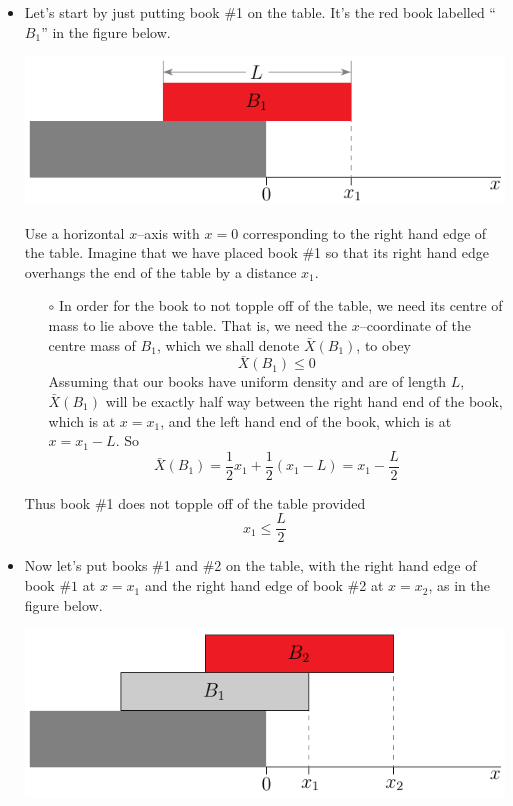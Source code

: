 \begin{itemize}
\item
Let's start by just putting book \#1 on the table. It's the red book
labelled ``$B_1$'' in the figure below.
\begin{efig}
\begin{center}
     \includegraphics{bookStackV1.pdf}
\end{center}
\end{efig}
Use a horizontal $x$--axis with $x=0$ corresponding to the right hand
edge of the table. Imagine that we have placed book \#1 so that its
right hand edge overhangs the end of the table by a distance $x_1$.
\begin{itemize}\itemsep1pt \parskip0pt  \itemindent-10pt
\item[$\circ$]
In order for the book to not topple off of the table, we need its
centre of mass to lie above the table. That is, we need the $x$--coordinate
of the centre mass of $B_1$, which we shall denote $\bar X(B_1)$, to obey
\begin{equation*}
\bar X(B_1) \le 0
\end{equation*}
Assuming that our books have uniform density and are of length
$L$, $\bar X(B_1)$ will be exactly half way between the right hand end of the
book, which is at $x=x_1$, and the left hand end of the book, which is at
$x=x_1-L$. So
\begin{equation*}
\bar X(B_1) =\frac{1}{2} x_1+\frac{1}{2}(x_1-L)
            = x_1-\frac{L}{2}
\end{equation*}
\end{itemize}
Thus book \#1 does not topple off of the table provided
\begin{equation*}
x_1\le\frac{L}{2}
\end{equation*}

\item
Now let's put books \#1 and \#2 on the table, with the right hand edge of
book \#$1$ at $x=x_1$ and the right hand edge of book \#2 at
$x=x_2$, as in the figure below.
\begin{efig}
\begin{center}
     \includegraphics{bookStackV2a.pdf}
\end{center}
\end{efig}


\end{itemize}
